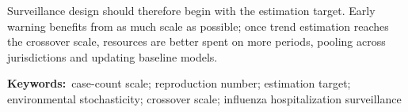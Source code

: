 Surveillance design should therefore begin with the estimation target. Early warning benefits from as much scale as possible; once trend estimation reaches the crossover scale, resources are better spent on more periods, pooling across jurisdictions and updating baseline models.

\vspace{1em}
\noindent\textbf{Keywords:}\ \sloppy case-count scale; reproduction number; estimation target; environmental stochasticity; crossover scale; influenza hospitalization surveillance
